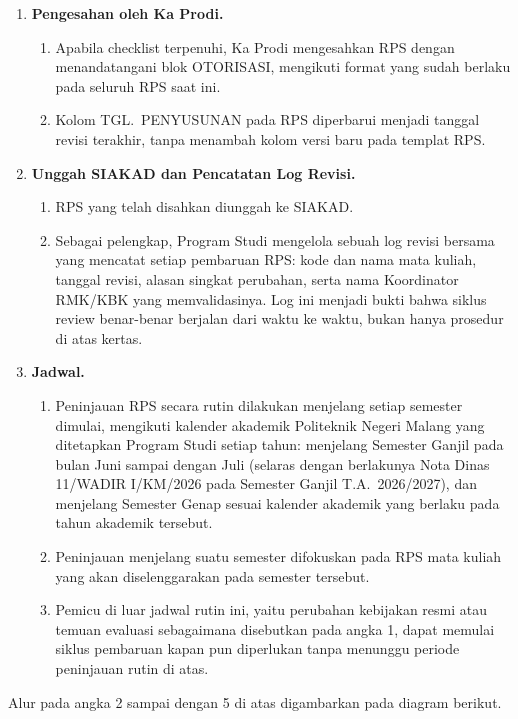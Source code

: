 \documentclass[12pt,a4paper]{report}
\begin{document}
\begin{enumerate}
\item \textbf{Pengesahan oleh Ka Prodi.}
  \begin{enumerate}
  \item Apabila checklist terpenuhi, Ka Prodi mengesahkan RPS dengan menandatangani blok OTORISASI, mengikuti format yang sudah berlaku pada seluruh RPS saat ini.
  \item Kolom TGL.\ PENYUSUNAN pada RPS diperbarui menjadi tanggal revisi terakhir, tanpa menambah kolom versi baru pada templat RPS.
  \end{enumerate}

\item \textbf{Unggah SIAKAD dan Pencatatan Log Revisi.}
  \begin{enumerate}
  \item RPS yang telah disahkan diunggah ke SIAKAD.
  \item Sebagai pelengkap, Program Studi mengelola sebuah log revisi bersama yang mencatat setiap pembaruan RPS: kode dan nama mata kuliah, tanggal revisi, alasan singkat perubahan, serta nama Koordinator RMK/KBK yang memvalidasinya. Log ini menjadi bukti bahwa siklus review benar-benar berjalan dari waktu ke waktu, bukan hanya prosedur di atas kertas.
  \end{enumerate}

\item \textbf{Jadwal.}
  \begin{enumerate}
  \item Peninjauan RPS secara rutin dilakukan menjelang setiap semester dimulai, mengikuti kalender akademik Politeknik Negeri Malang yang ditetapkan Program Studi setiap tahun: menjelang Semester Ganjil pada bulan Juni sampai dengan Juli (selaras dengan berlakunya Nota Dinas 11/WADIR I/KM/2026 pada Semester Ganjil T.A.\ 2026/2027), dan menjelang Semester Genap sesuai kalender akademik yang berlaku pada tahun akademik tersebut.
  \item Peninjauan menjelang suatu semester difokuskan pada RPS mata kuliah yang akan diselenggarakan pada semester tersebut.
  \item Pemicu di luar jadwal rutin ini, yaitu perubahan kebijakan resmi atau temuan evaluasi sebagaimana disebutkan pada angka 1, dapat memulai siklus pembaruan kapan pun diperlukan tanpa menunggu periode peninjauan rutin di atas.
  \end{enumerate}
\end{enumerate}

Alur pada angka 2 sampai dengan 5 di atas digambarkan pada diagram berikut.
\end{document}

